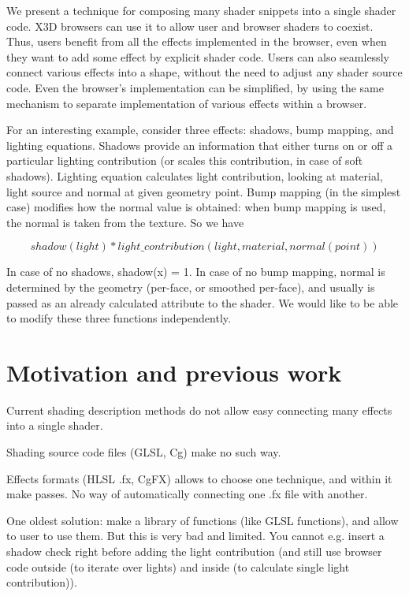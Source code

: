 \documentclass{acmsiggraph}                     %
\begin{document}
\copyrightspace

We present a technique for composing many shader snippets into a
single shader code. X3D browsers can use it to allow user and browser
shaders to coexist. Thus, users benefit from all the effects
implemented in the browser, even when they want to add some effect by
explicit shader code. Users can also seamlessly connect various
effects into a shape, without the need to adjust any shader source
code. Even the browser's implementation can be simplified, by using
the same mechanism to separate implementation of various effects
within a browser.

For an interesting example, consider three effects: shadows, bump
mapping, and lighting equations. Shadows provide an information that
either turns on or off a particular lighting contribution (or scales
this contribution, in case of soft shadows). Lighting equation
calculates light contribution, looking at material, light source and
normal at given geometry point. Bump mapping
\cite{vrmleng:bumpmapping} (in the simplest case)
modifies how the normal value is obtained: when bump mapping is used,
the normal is taken from the texture. So we have

$$ shadow(light) * light\_contribution(light, material, normal(point)) $$

In case of no shadows, shadow(x) = 1. In case of no bump mapping,
normal is determined by the geometry (per-face, or smoothed per-face),
and usually is passed as an already calculated attribute to the
shader. We would like to be able to modify these three functions independently.

\section{Motivation and previous work}

Current shading description methods do not allow easy connecting
many effects into a single shader.

Shading source code files (GLSL, Cg) make no such way.

Effects formats (HLSL .fx, CgFX) allows to choose one technique, and
within it make passes. No way of automatically connecting one .fx file
with another.

One oldest solution: make a library of functions (like GLSL
functions), and allow to user to use them. But this is very bad and
limited. You cannot e.g. insert a shadow check right before adding the
light contribution (and still use browser code outside (to iterate
over lights) and inside (to calculate single light contribution)).
\end{document}
